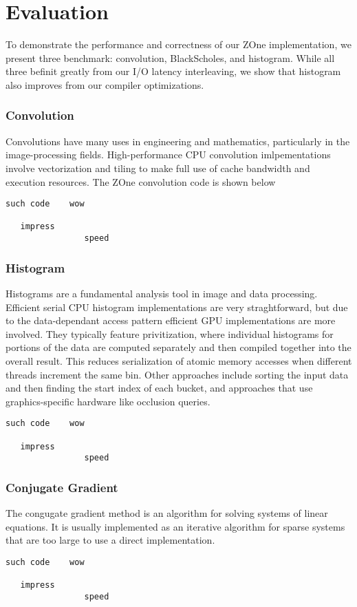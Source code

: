 \section{Evaluation}

To demonstrate the performance and correctness of our ZOne implementation, we
present three benchmark: convolution, BlackScholes, and histogram.
While all three befinit greatly from our I/O latency interleaving, we show
	that histogram also improves from our compiler optimizations.

\subsubsection{Convolution}
Convolutions have many uses in engineering and mathematics, particularly in
the image-processing fields. High-performance CPU convolution imlpementations
involve vectorization and tiling to make full use of cache bandwidth and 
execution resources. The ZOne convolution code is shown below

\begin{verbatim}
such code    wow

   impress
                speed
\end{verbatim}


\subsubsection{Histogram}
Histograms are a fundamental analysis tool in image and data processing.
Efficient serial CPU histogram implementations are very straghtforward, but
due to the data-dependant access pattern efficient GPU implementations are
more involved. They typically feature privitization,
where individual histograms for portions of the data are computed separately
and then compiled together into the overall result. This reduces serialization
of atomic memory accesses when different threads increment the same bin.
Other approaches include sorting the input data and then finding the start
index of each bucket, and approaches that use graphics-specific hardware like
occlusion queries.

\begin{verbatim}
such code    wow

   impress
                speed
\end{verbatim}


\subsubsection*{Conjugate Gradient}
The congugate gradient method is an algorithm for solving systems of linear
equations. It is usually implemented as an iterative algorithm for sparse
systems that are too large to use a direct implementation.

\begin{verbatim}
such code    wow

   impress
                speed
\end{verbatim}


